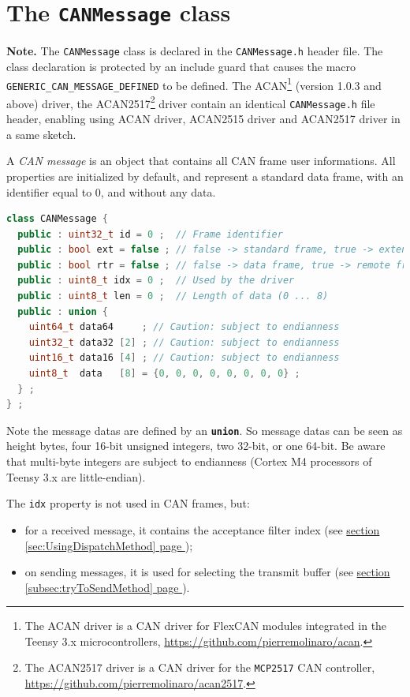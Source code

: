 \documentclass[10pt, a4paper, obeyspaces]{extarticle}
\newcommand \sectionLabel[2]{\section{#1}\label{sec:#2}}
\newcommand\refSectionPage[1]{\hyperref[sec:#1]{section \ref*{sec:#1} page \pageref{sec:#1}}}
\newcommand\refSubsectionPage[1]{\hyperref[subsec:#1]{section \ref*{subsec:#1} page \pageref{subsec:#1}}}
\begin{document}
\sectionLabel{The \texttt{CANMessage} class}{CANMessageClass}

{\bf Note. } The \texttt{CANMessage} class is declared in the \texttt{CANMessage.h} header file. The class declaration is protected by an include guard that causes the macro \texttt{GENERIC\_CAN\_MESSAGE\_DEFINED} to be defined. The ACAN\footnote{The ACAN driver is a CAN driver for FlexCAN modules integrated in the Teensy 3.x microcontrollers, \url{https://github.com/pierremolinaro/acan}.} (version 1.0.3 and above) driver, the ACAN2517\footnote{The ACAN2517 driver is a CAN driver for the \texttt{MCP2517} CAN controller, \url{https://github.com/pierremolinaro/acan2517}.} driver contain an identical \texttt{CANMessage.h} file header, enabling using ACAN driver, ACAN2515 driver and ACAN2517 driver in a same sketch.

A \emph{CAN message} is an object that contains all CAN frame user informations. All properties are initialized by default, and represent a standard data frame, with an identifier equal to $0$, and without any data.

{ \small\begin{lstlisting}[language=c++]
class CANMessage {
  public : uint32_t id = 0 ;  // Frame identifier
  public : bool ext = false ; // false -> standard frame, true -> extended frame
  public : bool rtr = false ; // false -> data frame, true -> remote frame
  public : uint8_t idx = 0 ;  // Used by the driver
  public : uint8_t len = 0 ;  // Length of data (0 ... 8)
  public : union {
    uint64_t data64     ; // Caution: subject to endianness
    uint32_t data32 [2] ; // Caution: subject to endianness
    uint16_t data16 [4] ; // Caution: subject to endianness
    uint8_t  data   [8] = {0, 0, 0, 0, 0, 0, 0, 0} ;
  } ;
} ;
\end{lstlisting}}

Note the message datas are defined by an {\bf\texttt{union}}. So message datas can be seen as height bytes, four 16-bit unsigned integers, two 32-bit, or one 64-bit. Be aware that multi-byte integers are subject to endianness (Cortex M4 processors of Teensy 3.x are little-endian).

The \texttt{idx} property is not used in CAN frames, but:
\begin{itemize}
  \item for a received message, it contains the acceptance filter index (see \refSectionPage{UsingDispatchMethod});
  \item on sending messages, it is used for selecting the transmit buffer (see \refSubsectionPage{tryToSendMethod}).
\end{itemize}
\end{document}
